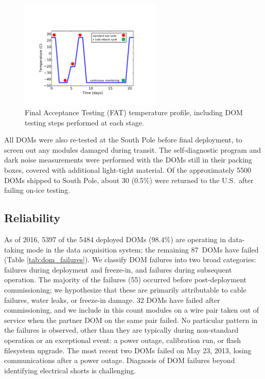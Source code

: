 \begin{figure}[!h]
 \centering
 \includegraphics[width=0.6\textwidth]{graphics/dom/production/fat_cycle.pdf}
 \caption{Final Acceptance Testing (FAT) temperature profile, including
   DOM testing steps performed at each stage.}
 \label{fig:fat_cycle}
\end{figure}

All DOMs were also re-tested at the South Pole before final deployment, to
screen out any modules damaged during transit.  The self-diagnostic
program and dark noise measurements were performed with the DOMs still in
their packing boxes, covered with additional light-tight material.  Of the
approximately 5500 DOMs shipped to South Pole, about 30 (0.5\%) were
returned to the U.S.~after failing on-ice testing.    

\subsection{\label{sec:reliability}Reliability}

As of 2016, 5397 of the 5484 deployed DOMs ($98.4\%$) are operating in
data-taking mode in the data acquisition system; the remaining 87~DOMs
have failed (Table
\ref{tab:dom_failures}).  We classify DOM 
failures into two broad categories: failures during deployment and
freeze-in, and failures during subsequent operation.  The majority of the
failures (55) occurred before post-deployment commissioning; we hypothesize
that these are primarily attributable to cable failures, water leaks,
or freeze-in damage. 32 DOMs have failed after commissioning, and
we include in this count modules on a wire pair taken out of service when
the partner DOM on the same pair failed.  No particular pattern in the
failures is observed, other than they are typically during non-standard
operation or an exceptional event: a power outage, calibration run, or
flash filesystem upgrade.  The most recent two DOMs failed on May 23, 2013,
losing communications after a power outage.  Diagnosis of DOM failures
beyond identifying electrical shorts is challenging.

